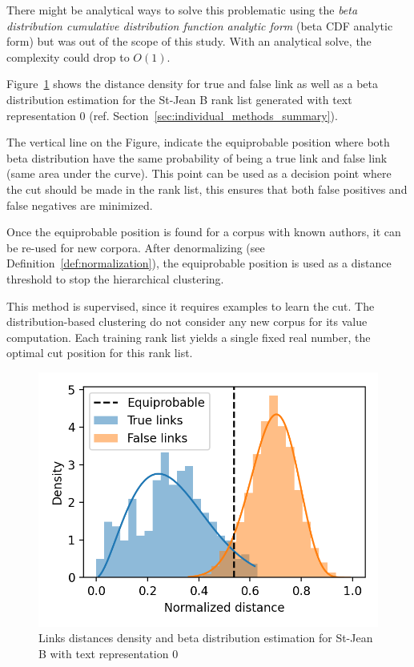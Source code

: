 There might be analytical ways to solve this problematic using the \textit{beta distribution cumulative distribution function analytic form} (beta CDF analytic form) but was out of the scope of this study.
With an analytical solve, the complexity could drop to $O(1)$.

Figure~\ref{fig:links_score_density} shows the distance density for true and false link as well as a beta distribution estimation for the St-Jean B rank list generated with text representation 0 (ref. Section~\ref{sec:individual_methods_summary}).

The vertical line on the Figure, indicate the equiprobable position where both beta distribution have the same probability of being a true link and false link (same area under the curve).
This point can be used as a decision point where the cut should be made in the rank list, this ensures that both false positives and false negatives are minimized.

Once the equiprobable position is found for a corpus with known authors, it can be re-used for new corpora.
After denormalizing (see Definition~\ref{def:normalization}), the equiprobable position is used as a distance threshold to stop the hierarchical clustering.

This method is supervised, since it requires examples to learn the cut.
The distribution-based clustering do not consider any new corpus for its value computation.
Each training rank list yields a single fixed real number, the optimal cut position for this rank list.

\begin{figure}
  \caption{Links distances density and beta distribution estimation for St-Jean B with text representation 0}
  \label{fig:links_score_density}
  \includegraphics[width=\linewidth]{img/links_score_density.png}
\end{figure}

